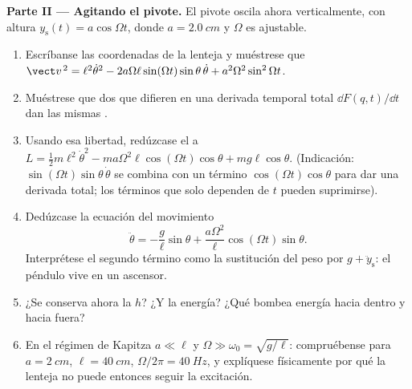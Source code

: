 \begin{problem}
\medskip\noindent\textbf{Parte II --- Agitando el pivote.}
El pivote oscila ahora verticalmente, con altura $y_{\text{s}}(t) =
a\cos\Omega t$, donde $a = \qty{2.0}{cm}$ y $\Omega$ es ajustable.
\begin{enumerate}[resume]
  \item Escríbanse las coordenadas de la lenteja y muéstrese que
        $\vect v^{\,2} = \ell^2\dot\theta^2 -
        2a\Omega\ell\sin(\Omega t)\sin\theta\,\dot\theta +
        a^2\Omega^2\sin^2\Omega t$.
  \item Muéstrese que dos  que difieren en una derivada temporal
        total $\dd F(q,t)/\dd t$ dan las mismas .
  \item Usando esa libertad, redúzcase el  a $L = \tfrac12 m
        \ell^2\dot\theta^2 - ma\Omega^2\ell\cos(\Omega t)\cos\theta +
        mg\ell\cos\theta$. (Indicación: $\sin(\Omega t)\sin\theta\,\dot\theta$
        se combina con un término $\cos(\Omega t)\cos\theta$ para dar una
        derivada total; los términos que solo dependen de $t$ pueden
        suprimirse).
  \item Dedúzcase la ecuación del movimiento
        \[
        \ddot\theta = -\frac{g}{\ell}\sin\theta
         + \frac{a\Omega^2}{\ell}\cos(\Omega t)\sin\theta .
        \]
        Interprétese el segundo término como la sustitución del peso por $g +
        \ddot y_{\text{s}}$: el péndulo vive en un ascensor.
  \item ¿Se conserva ahora la  $h$? ¿Y la energía? ¿Qué
        bombea energía hacia dentro y hacia fuera?
  \item En el régimen de Kapitza $a \ll \ell$ y $\Omega \gg \omega_0 =
        \sqrt{g/\ell}$: compruébense para $a = \qty{2}{cm}$, $\ell =
        \qty{40}{cm}$, $\Omega/2\pi = \qty{40}{Hz}$, y explíquese
        físicamente por qué la lenteja no puede entonces seguir la excitación.
\end{enumerate}


\end{problem}
